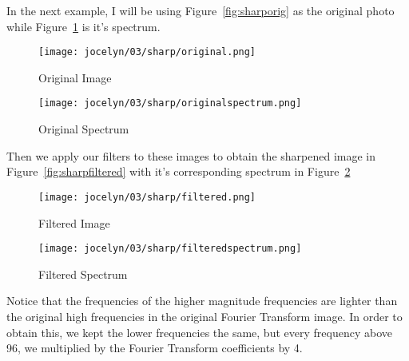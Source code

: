 \documentclass [../article.tex]{subfiles}
\begin{document}
  In the next example, I will be using Figure~\ref{fig:sharporig}
  as the original photo while Figure~\ref{fig:sharporigspectrum}
  is it's spectrum.
  \begin{figure}[htbp]
      \texttt{[image: jocelyn/03/sharp/original.png]}
      \caption{Original Image}
      \label{fig:sharporig}
    \endminipage\hfill
      \texttt{[image: jocelyn/03/sharp/originalspectrum.png]}
      \caption{Original Spectrum}
      \label{fig:sharporigspectrum}
    \endminipage
  \end{figure}
  Then we apply our filters to these images to obtain the sharpened
  image in Figure~\ref{fig:sharpfiltered} with it's corresponding
  spectrum in Figure~\ref{fig:sharpfilteredspectrum}
  \begin{figure}[htbp]
      \texttt{[image: jocelyn/03/sharp/filtered.png]}
      \caption{Filtered Image}
      \label{fig:sharpfiltered}
    \endminipage\hfill
      \texttt{[image: jocelyn/03/sharp/filteredspectrum.png]}
      \caption{Filtered Spectrum}
      \label{fig:sharpfilteredspectrum}
    \endminipage
  \end{figure}
  Notice that the frequencies of the higher magnitude frequencies
  are lighter than the original high frequencies in the original
  Fourier Transform image.  In order to obtain this, we kept the
  lower frequencies the same, but every frequency above 96, we
  multiplied by the Fourier Transform coefficients by 4.
\end{document}
